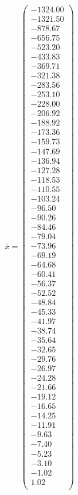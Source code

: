 \documentclass[a4paper,12pt]{article}
\begin{document}
$\bar { x } = \begin{pmatrix}
-1324.00 \\
-1321.50 \\
-878.67 \\
-656.75 \\
-523.20 \\
-433.83 \\
-369.71 \\
-321.38 \\
-283.56 \\
-253.10 \\
-228.00 \\
-206.92 \\
-188.92 \\
-173.36 \\
-159.73 \\
-147.69 \\
-136.94 \\
-127.28 \\
-118.53 \\
-110.55 \\
-103.24 \\
-96.50 \\
-90.26 \\
-84.46 \\
-79.04 \\
-73.96 \\
-69.19 \\
-64.68 \\
-60.41 \\
-56.37 \\
-52.52 \\
-48.84 \\
-45.33 \\
-41.97 \\
-38.74 \\
-35.64 \\
-32.65 \\
-29.76 \\
-26.97 \\
-24.28 \\
-21.66 \\
-19.12 \\
-16.65 \\
-14.25 \\
-11.91 \\
-9.63 \\
-7.40 \\
-5.23 \\
-3.10 \\
-1.02 \\
1.02 \\
\end{pmatrix}
$
\end{document}
